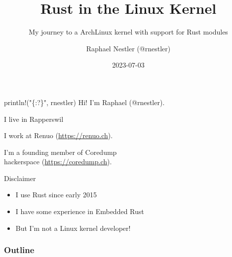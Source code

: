 \documentclass[aspectratio=1609,14pt,t]{beamer}
\title{Rust in the Linux Kernel}
\subtitle{My journey to a ArchLinux kernel with support for Rust modules}
\date{2023-07-03}
\author{Raphael Nestler (@rnestler)}
\institute{Rust Zürichsee Meetup}
\begin{document}
\pagecolor{almostwhite}  %
\maketitle


\begin{frame}[c]{println!("\{:?\}", rnestler)}
  Hi! I'm Raphael (@rnestler).

  \pause I live in Rapperswil

  \pause I work at Renuo ({\small \url{https://renuo.ch}}).

  \pause I'm a founding member of Coredump\\hackerspace ({\small \url{https://coredump.ch}}).
\end{frame}

\begin{frame}[c]{Disclaimer}
  \begin{itemize}
    \item I use Rust since early 2015
    \item I have some experience in Embedded Rust
    \item But I'm not a Linux kernel developer!
  \end{itemize}
\end{frame}


\begin{frame}
  \frametitle{Outline}
  \setcounter{tocdepth}{1}
  \tableofcontents
\end{frame}











\end{document}
